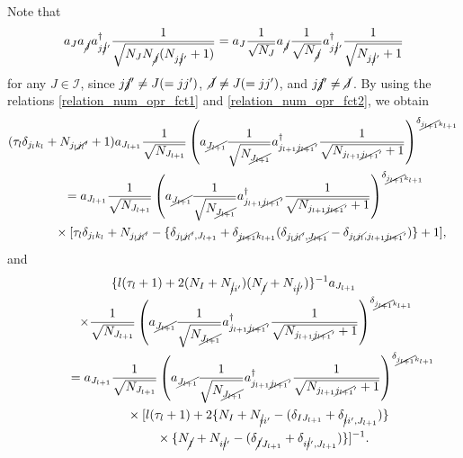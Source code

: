 \documentclass[10pt,a4paper]{amsart}
\numberwithin{equation}{section}
\begin{document}
Note that
\begin{align*}
a_{J}
a_{\cancel{J}}
a_{j\cancel{j}'}^{\dagger}
\frac{1}{
\sqrt{
N_{J}
N_{\cancel{J}}
 (
N_{j\cancel{j}'}+1
 )
}
}
=
a_{J}
\frac{1}{\sqrt{N_{J}}}
a_{\cancel{J}}
\frac{1}{\sqrt{N_{\cancel{J}}}}
a_{j\cancel{j}'}^{\dagger}
\frac{1}{\sqrt{N_{j\cancel{j}'}+1}}
\end{align*}
for any
$
J
\in
\mathcal{I}
$,
since
$
j\cancel{j}'
\neq
J
(=jj')
$,
$
\cancel{J}
\neq
J
(=jj')
$,
and
$
j\cancel{j}'
\neq
\cancel{J}
$.
By using the relations \eqref{relation_num_opr_fct1} and \eqref{relation_num_opr_fct2}, we obtain
\begin{gather*}
 (
 \tau_{l}
 \delta_{j_{l}k_{l}}
 +
 N_{j_{l}\cancel{j_{l}}'}
 +
 1
 )
 a_{J_{l+1}}
 \frac{1}{\sqrt{N_{J_{l+1}}}}
 \left(
 a_{\cancel{J_{l+1}}}
 \frac{1}{
 \sqrt{
 N_{\cancel{J_{l+1}}}
 }
 }
 a_{j_{l+1}\cancel{j_{l+1}}'}^{\dagger}
 \frac{1}{
 \sqrt{
 N_{j_{l+1}\cancel{j_{l+1}}'}+1
 }
 }
 \right)^{\delta_{\cancel{j_{l+1}}k_{l+1}}}
 \\
 \qquad=
 a_{J_{l+1}}
 \frac{1}{\sqrt{N_{J_{l+1}}}}
 \left(
 a_{\cancel{J_{l+1}}}
 \frac{1}{
 \sqrt{
 N_{\cancel{J_{l+1}}}
 }
 }
 a_{j_{l+1}\cancel{j_{l+1}}'}^{\dagger}
 \frac{1}{
 \sqrt{
 N_{j_{l+1}\cancel{j_{l+1}}'}+1
 }
 }
 \right)^{\delta_{\cancel{j_{l+1}}k_{l+1}}}
 \\
\phantom{ \qquad=}{} \times
 [
 \tau_{l}
 \delta_{j_{l}k_{l}}
 +
 N_{j_{l}\cancel{j_{l}}'}
 -
 \{
 \delta_{
 j_{l}\cancel{j_{l}}',
 J_{l+1}
 }
 +
 \delta_{\cancel{j_{l+1}}k_{l+1}}
 (
 \delta_{
 j_{l}\cancel{j_{l}}',
 \cancel{J_{l+1}}
 }
 -
 \delta_{
 j_{l}\cancel{j_{l}},
 j_{l+1}\cancel{j_{l+1}}'
 }
 )
 \}
 +
 1
 ],
\end{gather*}
and
\begin{gather*}
 \{
 l
 (
 \tau_{l}
 +
 1
 )
 +
 2
 (
 N_{I}
 +
 N_{\cancel{i}i'}
 )
 (
 N_{\cancel{I}}
 +
 N_{i\cancel{i}'}
 )
 \}^{-1}
 a_{J_{l+1}}\\
 \qquad\times
 \frac{1}{\sqrt{N_{J_{l+1}}}}
 \left(
 a_{\cancel{J_{l+1}}}
 \frac{1}{
 \sqrt{
 N_{\cancel{J_{l+1}}}
 }
 }
 a_{j_{l+1}\cancel{j_{l+1}}'}^{\dagger}
 \frac{1}{
 \sqrt{
 N_{j_{l+1}\cancel{j_{l+1}}'}+1
 }
 }
 \right)^{\delta_{\cancel{j_{l+1}}k_{l+1}}}
 \\
 \phantom{ \qquad\times}{}
 =
 a_{J_{l+1}}
 \frac{1}{\sqrt{N_{J_{l+1}}}}
 \left(
 a_{\cancel{J_{l+1}}}
 \frac{1}{
 \sqrt{
 N_{\cancel{J_{l+1}}}
 }
 }
 a_{j_{l+1}\cancel{j_{l+1}}'}^{\dagger}
 \frac{1}{
 \sqrt{
 N_{j_{l+1}\cancel{j_{l+1}}'}+1
 }
 }
 \right)^{\delta_{\cancel{j_{l+1}}k_{l+1}}}
 \\
 \phantom{ \qquad\times=}{}
 \times
 [
 l
 (
 \tau_{l}
 +
 1
 )
 +
 2
 \{
 N_{I}
 +
 N_{\cancel{i}i'}
 -
 (
 \delta_{IJ_{l+1}}
 +
 \delta_{\cancel{i}i',J_{l+1}}
 )
 \}\\
 \phantom{ \qquad=\times
 \times}{}\times
 \{
 N_{\cancel{I}}
 +
 N_{i\cancel{i}'}
 -
 (
 \delta_{\cancel{I}J_{l+1}}
 +
 \delta_{i\cancel{i}',J_{l+1}}
 )
 \}
 ]^{-1}
 .
\end{gather*}
\end{document}
